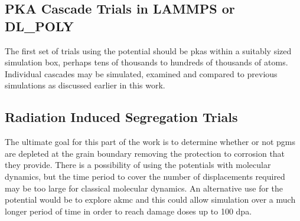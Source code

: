 \subsection{PKA Cascade Trials in LAMMPS or DL\_POLY}

The first set of trials using the potential should be \acrshort{pka}s within a suitably sized simulation box, perhaps tens of thousands to hundreds of thousands of atoms.  Individual cascades may be simulated, examined and compared to previous simulations as discussed earlier in this work.
 

\subsection{Radiation Induced Segregation Trials}

The ultimate goal for this part of the work is to determine whether or not \acrshort{pgm}s are depleted at the grain boundary removing the protection to corrosion that they provide.  There is a possibility of using the potentials with molecular dynamics, but the time period to cover the number of displacements required may be too large for classical molecular dynamics.  An alternative use for the potential would be to explore \acrfull{akmc} and this could allow simulation over a much longer period of time in order to reach damage doses up to 100 \acrshort{dpa}.



